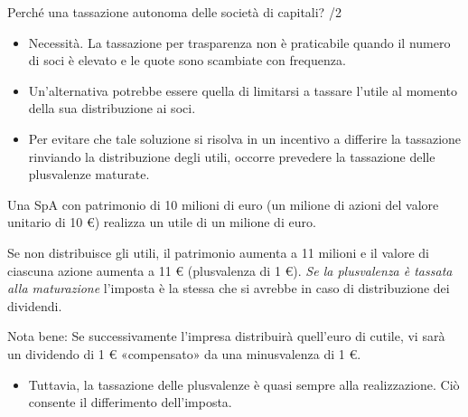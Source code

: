 \documentclass[11pt,italian]{beamer}
\begin{document}
\begin{frame}{Perché una tassazione autonoma delle società di capitali? /2}
\begin{itemize}
\item \alert{Necessità.} La tassazione per trasparenza non è praticabile quando il
numero di soci è elevato e le quote sono scambiate con frequenza.
\item Un'alternativa potrebbe essere quella di limitarsi a tassare l'utile al
momento della sua distribuzione ai soci.
\item Per evitare che tale soluzione si risolva in un incentivo a differire la
tassazione rinviando la distribuzione degli utili, occorre prevedere la
tassazione delle plusvalenze maturate.
\end{itemize}
\begin{block}{}
\small
Una SpA con patrimonio di 10 milioni di euro (un milione di azioni
del valore unitario di 10 €) realizza un utile di un milione di euro.

Se non distribuisce gli utili, il patrimonio aumenta a 11 milioni e il
valore di ciascuna azione aumenta a 11 € (plusvalenza di 1 €). \emph{Se la
plusvalenza è tassata alla maturazione} l'imposta è la stessa che si avrebbe
in caso di distribuzione dei dividendi.

Nota bene: Se successivamente l'impresa distribuirà quell'euro di
cutile, vi sarà un dividendo di 1 € «compensato» da una minusvalenza di 1 €.
\end{block}

\begin{itemize}
\item Tuttavia, la tassazione delle plusvalenze è quasi sempre alla
realizzazione. Ciò consente il differimento dell'imposta.
\end{itemize}
\end{frame}
\end{document}
